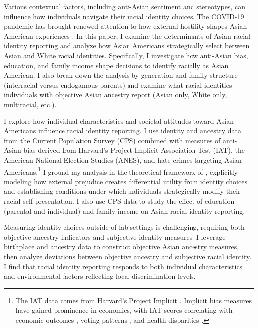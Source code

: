 Various contextual factors, including anti-Asian sentiment and stereotypes, can influence how individuals navigate their racial identity choices. The COVID-19 pandemic has brought renewed attention to how external hostility shapes Asian American experiences \autocite{gover2020anti}. In this paper, I examine the determinants of Asian racial identity reporting and analyze how Asian Americans strategically select between Asian and White racial identities. Specifically, I investigate how anti-Asian bias, education, and family income shape decisions to identify racially as Asian American. I also break down the analysis by generation and family structure (interracial versus endogamous parents) and examine what racial identities individuals with objective Asian ancestry report (Asian only, White only, multiracial, etc.).

I explore how individual characteristics and societal attitudes toward Asian Americans influence racial identity reporting. I use identity and ancestry data from the Current Population Survey (CPS) combined with measures of anti-Asian bias derived from Harvard's Project Implicit Association Test (IAT), the American National Election Studies (ANES), and hate crimes targeting Asian Americans.\footnote{The IAT data comes from Harvard's Project Implicit \autocite{greenwaldMeasuringIndividualDifferences1998}. Implicit bias measures have gained prominence in economics, with IAT scores correlating with economic outcomes \autocite{chettyRaceEconomicOpportunity2020,gloverDiscriminationSelfFulfillingProphecy2017}, voting patterns \autocite{friesePredictingVotingBehavior2007}, and health disparities \autocite{leitnerRacialBiasAssociated2016}.} I ground my analysis in the theoretical framework of \textcite{akerlofEconomicsIdentity2000}, explicitly modeling how external prejudice creates differential utility from identity choices and establishing conditions under which individuals strategically modify their racial self-presentation. I also use CPS data to study the effect of education (parental and individual) and family income on Asian racial identity reporting.

Measuring identity choices outside of lab settings is challenging, requiring both objective ancestry indicators and subjective identity measures. I leverage birthplace and ancestry data to construct objective Asian ancestry measures, then analyze deviations between objective ancestry and subjective racial identity. I find that racial identity reporting responds to both individual characteristics and environmental factors reflecting local discrimination levels. 

